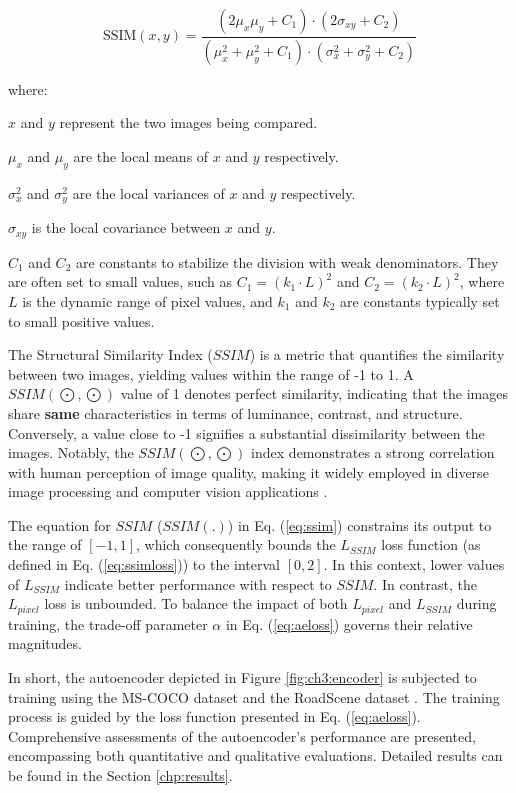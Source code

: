 \begin{equation}\label{eq:ssim}
\text{SSIM}(x, y) = \frac{{(2\mu_x\mu_y + C_1) \cdot (2\sigma_{xy} + C_2)}}{{(\mu_x^2 + \mu_y^2 + C_1) \cdot (\sigma_x^2 + \sigma_y^2 + C_2)}}
\end{equation}

where:
\begin{list}{}{}
    \item\(x\) and \(y\) represent the two images being compared.
    \item\(\mu_x\) and \(\mu_y\) are the local means of \(x\) and \(y\) respectively.
    \item\(\sigma_x^2\) and \(\sigma_y^2\) are the local variances of \(x\) and \(y\) respectively.
    \item\(\sigma_{xy}\) is the local covariance between \(x\) and \(y\).
    \item\(C_1\) and \(C_2\) are constants to stabilize the division with weak denominators. They are often set to small values, such as \(C_1 = (k_1 \cdot L)^2\) and \(C_2 = (k_2 \cdot L)^2\), where \(L\) is the dynamic range of pixel values, and \(k_1\) and \(k_2\) are constants typically set to small positive values.
\end{list}

The Structural Similarity Index ($SSIM$) is a metric that quantifies the similarity between two images, yielding values within the range of -1 to 1. A $SSIM(\bigodot,\bigodot)$ value of 1 denotes perfect similarity, indicating that the images share \textbf{same} characteristics in terms of luminance, contrast, and structure. Conversely, a value close to -1 signifies a substantial dissimilarity between the images. Notably, the $SSIM(\bigodot,\bigodot)$ index demonstrates a strong correlation with human perception of image quality, making it widely employed in diverse image processing and computer vision applications \cite{ma2015perceptual}.

The equation for $SSIM$ ($SSIM(.)$) in Eq. (\ref{eq:ssim}) constrains its output to the range of $[-1,1]$, which consequently bounds the $L_{SSIM}$ loss function (as defined in Eq. (\ref{eq:ssimloss})) to the interval $[0,2]$. In this context, lower values of $L_{SSIM}$ indicate better performance with respect to $SSIM$. In contrast, the $L_{pixel}$ loss is unbounded. To balance the impact of both $L_{pixel}$ and $L_{SSIM}$ during training, the trade-off parameter $\alpha$ in Eq. (\ref{eq:aeloss}) governs their relative magnitudes.

In short, the autoencoder depicted in Figure \ref{fig:ch3:encoder} is subjected to training using the MS-COCO dataset \cite{lin2014microsoft} and the RoadScene dataset \cite{xu2020aaai}. The training process is guided by the loss function presented in Eq. (\ref{eq:aeloss}). Comprehensive assessments of the autoencoder's performance are presented, encompassing both quantitative and qualitative evaluations. Detailed results can be found in the Section \ref{chp:results}.

